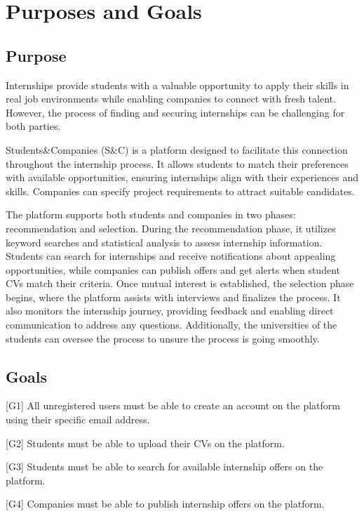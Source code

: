 \renewcommand{\thesection}{\Alph{section}}
\section{Purposes and Goals}\label{sec:purposeandgoals}
\subsection{Purpose}\label{subsec:purpose}
Internships provide students with a valuable opportunity to apply their skills in real job environments while enabling companies to connect with 
fresh talent. However, the process of finding and securing internships can be challenging for both parties.

Students\&Companies (S\&C) is a platform designed to facilitate this connection throughout the internship process. It allows 
students to match their preferences with available opportunities, ensuring internships align with their experiences and skills. 
Companies can specify project requirements to attract suitable candidates.

The platform supports both students and companies in two phases: recommendation and selection. During the recommendation phase, 
it utilizes keyword searches and statistical analysis to assess internship information. Students can search for internships and receive 
notifications about appealing opportunities, while companies can publish offers and get alerts when student CVs match their criteria.
Once mutual interest is established, the selection phase begins, where the platform assists with interviews and finalizes the process. 
It also monitors the internship journey, providing feedback and enabling direct communication to address any questions. Additionally, 
the universities of the students can oversee the process to unsure the process is going smoothly.

\subsection{Goals}\label{subsec:goals}
[G1] All unregistered users must be able to create an account on the platform using their specific email address.

[G2] Students must be able to upload their CVs on the platform.

[G3] Students must be able to search for available internship offers on the platform.

[G4] Companies must be able to publish internship offers on the platform.

